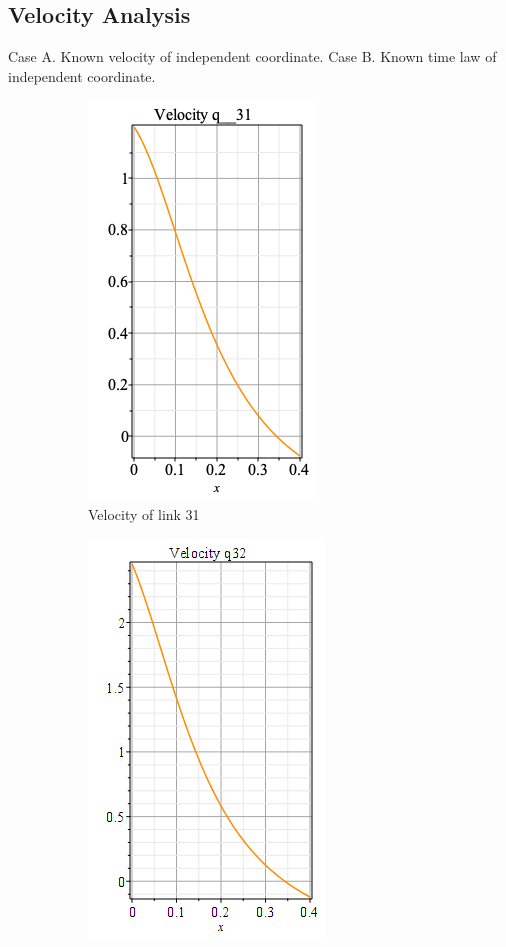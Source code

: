 \subsection{Velocity Analysis}
Case A. Known velocity of independent coordinate.\newline
Case B. Known time law of independent coordinate.\newline


\begin{figure}[h]

\begin{subfigure}{0.5\textwidth}
\includegraphics[height=0.9\linewidth]{images/Velocity31.png} 
\caption{Velocity of link 31}
\label{fig:subim1}
\end{subfigure}
\begin{subfigure}{0.5\textwidth}
\includegraphics[height=0.9\linewidth]{images/velocity32.png}

\end{subfigure}
\end{figure}
